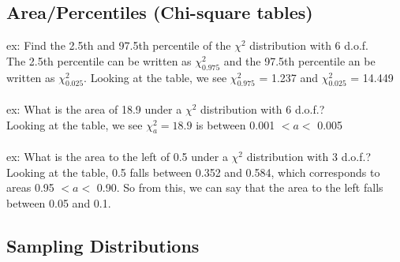 \documentclass[12pt, a4paper]{article}
\begin{document}
	\subsection{Area/Percentiles (Chi-square tables)}
	ex: Find the 2.5th and 97.5th percentile of the $\chi^2$ distribution with 6 d.o.f. \\
	The 2.5th percentile can be written as $\chi^2_{0.975}$ and the 97.5th percentile an be written as $\chi^2_{0.025}$. Looking at the table, we see $\chi^2_{0.975}$ = 1.237 and $\chi^2_{0.025}$ = 14.449 \\~\\
	ex: What is the area of 18.9 under a $\chi^2$ distribution with 6 d.o.f.? \\
	Looking at the table, we see $\chi^2_{a} = 18.9$ is between 0.001 $<a<$ 0.005 \\~\\
	ex: What is the area to the left of 0.5 under a $\chi^2$ distribution with 3 d.o.f.? \\
	Looking at the table, 0.5 falls between 0.352 and 0.584, which corresponds to areas 0.95 $<a<$ 0.90. So from this, we can say that the area to the left falls between 0.05 and 0.1. \newpage
	
\begin{center} \section{Sampling Distributions} \end{center}
\end{document}
